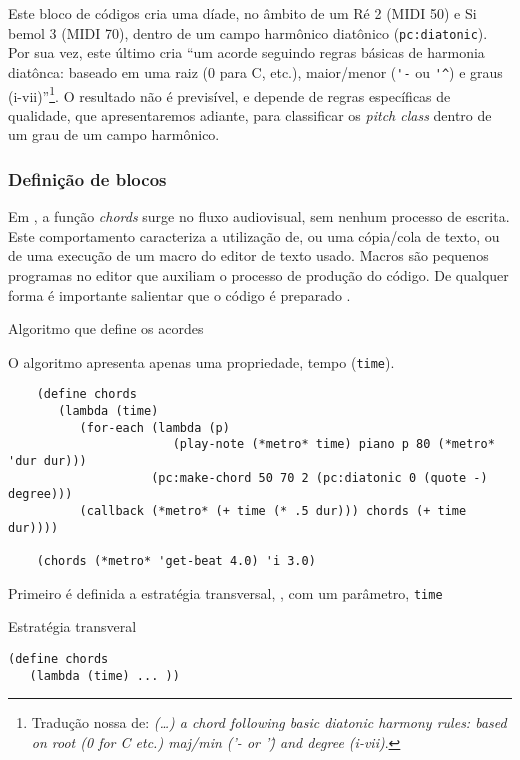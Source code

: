 Este bloco de códigos cria uma díade, no âmbito de um Ré 2 (MIDI 50) e Si bemol 3 (MIDI 70), dentro de um campo harmônico diatônico (\verb|pc:diatonic|). Por sua vez, este último cria ``um acorde seguindo regras básicas de harmonia diatônca: baseado em uma raiz (0 para C, etc.), maior/menor (\verb|'-| ou \verb|'^|) e graus (i-vii)''\footnote{Tradução nossa de: \emph{(\ldots) a chord following basic diatonic harmony rules: based on root (0 for C etc.) maj/min ('- or '\^) and degree (i-vii)}.}. O resultado não é previsível, e depende de regras específicas de qualidade, que apresentaremos adiante, para classificar os \emph{pitch class} dentro de um grau de um campo harmônico.

\subsubsection {Definição de blocos}\label{sec:define_chords}

Em , a função \emph{chords} surge no fluxo audiovisual, sem nenhum processo de escrita. Este comportamento caracteriza a utilização de, ou uma cópia/cola de texto, ou de uma execução de um macro do editor de texto usado. Macros são pequenos programas no editor que auxiliam o processo de produção do código. De qualquer forma é importante salientar que o código é preparado \cite{sorensen_youtube_2014}.

\begin{example}{Algoritmo que define os acordes}

O algoritmo apresenta apenas uma propriedade, tempo (\verb|time|).

\begin{verbatim}
    (define chords
       (lambda (time)
          (for-each (lambda (p)
                       (play-note (*metro* time) piano p 80 (*metro* 'dur dur)))                                 
                    (pc:make-chord 50 70 2 (pc:diatonic 0 (quote -) degree)))
          (callback (*metro* (+ time (* .5 dur))) chords (+ time dur))))

    (chords (*metro* 'get-beat 4.0) 'i 3.0)
\end{verbatim}
\end{example}

Primeiro é definida a estratégia transversal, , com um parâmetro, \verb|time|

\begin{example}{Estratégia transveral}
\begin{verbatim}
(define chords
   (lambda (time) ... ))
\end{verbatim}
\end{example}

